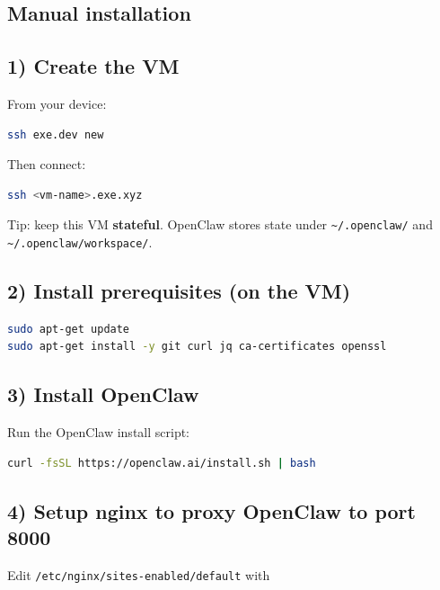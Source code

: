 \subsection{Manual installation}


\subsection{1) Create the VM}


From your device:

\begin{lstlisting}[language=bash]
ssh exe.dev new
\end{lstlisting}


Then connect:

\begin{lstlisting}[language=bash]
ssh <vm-name>.exe.xyz
\end{lstlisting}


Tip: keep this VM \textbf{stateful}. OpenClaw stores state under \texttt{\textasciitilde{}/.openclaw/} and \texttt{\textasciitilde{}/.openclaw/workspace/}.

\subsection{2) Install prerequisites (on the VM)}


\begin{lstlisting}[language=bash]
sudo apt-get update
sudo apt-get install -y git curl jq ca-certificates openssl
\end{lstlisting}


\subsection{3) Install OpenClaw}


Run the OpenClaw install script:

\begin{lstlisting}[language=bash]
curl -fsSL https://openclaw.ai/install.sh | bash
\end{lstlisting}


\subsection{4) Setup nginx to proxy OpenClaw to port 8000}


Edit \texttt{/etc/nginx/sites-enabled/default} with

